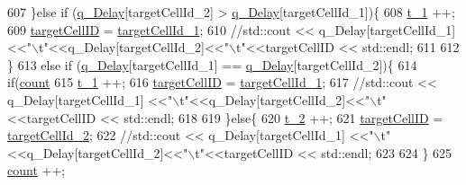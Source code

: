 \begin{DoxyCode}
607                         \}\textcolor{keywordflow}{else} \textcolor{keywordflow}{if} (\hyperlink{classns3_1_1McEnbPdcp_a30a6a039c211d3d31ff2a0cc56818c85}{q\_Delay}[targetCellId\_2] > \hyperlink{classns3_1_1McEnbPdcp_a30a6a039c211d3d31ff2a0cc56818c85}{q\_Delay}[targetCellId\_1])\{
608                                 \hyperlink{classns3_1_1McEnbPdcp_a93ce093c7aefaaf9b51f51ef50435c84}{t\_1} ++;
609                                 \hyperlink{classns3_1_1McEnbPdcp_a3c3eb4a4382244df123362ca72be5063}{targetCellID} = \hyperlink{classns3_1_1McEnbPdcp_a543097504b40179c297529d19a07165d}{targetCellId\_1};
610                                 \textcolor{comment}{//std::cout << q\_Delay[targetCellId\_1]
       <<"\(\backslash\)t"<<q\_Delay[targetCellId\_2]<<"\(\backslash\)t"<<targetCellID << std::endl;}
611 
612                         \}
613                         \textcolor{keywordflow}{else} \textcolor{keywordflow}{if} (\hyperlink{classns3_1_1McEnbPdcp_a30a6a039c211d3d31ff2a0cc56818c85}{q\_Delay}[targetCellId\_1] == \hyperlink{classns3_1_1McEnbPdcp_a30a6a039c211d3d31ff2a0cc56818c85}{q\_Delay}[targetCellId\_2])\{
614                                         \textcolor{keywordflow}{if}(\hyperlink{classns3_1_1McEnbPdcp_abd1cb5ff8d1a5c8b5e3d241d1fbd5240}{count} %
615                                                 \hyperlink{classns3_1_1McEnbPdcp_a93ce093c7aefaaf9b51f51ef50435c84}{t\_1} ++;
616                                                 \hyperlink{classns3_1_1McEnbPdcp_a3c3eb4a4382244df123362ca72be5063}{targetCellID} = 
      \hyperlink{classns3_1_1McEnbPdcp_a543097504b40179c297529d19a07165d}{targetCellId\_1};
617                                                 \textcolor{comment}{//std::cout << q\_Delay[targetCellId\_1]
       <<"\(\backslash\)t"<<q\_Delay[targetCellId\_2]<<"\(\backslash\)t"<<targetCellID << std::endl;}
618 
619                                         \}\textcolor{keywordflow}{else}\{
620                                                 \hyperlink{classns3_1_1McEnbPdcp_ad2273e371108f936f9086b8fb6d64b57}{t\_2} ++;
621                                                 \hyperlink{classns3_1_1McEnbPdcp_a3c3eb4a4382244df123362ca72be5063}{targetCellID} = 
      \hyperlink{classns3_1_1McEnbPdcp_a6dc7c7ba7f3f52242b52efd2aac0ac72}{targetCellId\_2};
622                                                 \textcolor{comment}{//std::cout << q\_Delay[targetCellId\_1]
       <<"\(\backslash\)t"<<q\_Delay[targetCellId\_2]<<"\(\backslash\)t"<<targetCellID << std::endl;}
623 
624                                         \}
625                                         \hyperlink{classns3_1_1McEnbPdcp_abd1cb5ff8d1a5c8b5e3d241d1fbd5240}{count} ++;

\end{DoxyCode}
